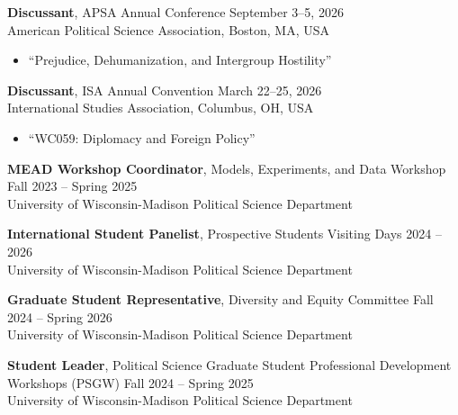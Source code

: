 \documentclass[11pt, letterpaper]{article}
\begin{document}
\vspace{-1mm}
\textbf{Discussant}, APSA Annual Conference \hfill September 3--5, 2026\\
American Political Science Association, Boston, MA, USA
\begin{itemize}
\vspace{-2mm}
    \item ``Prejudice, Dehumanization, and Intergroup Hostility''
\end{itemize}

\vspace{-2mm}
\textbf{Discussant}, ISA Annual Convention \hfill March 22--25, 2026\\
International Studies Association, Columbus, OH, USA
\begin{itemize}
\vspace{-2mm}
    \item ``WC059: Diplomacy and Foreign Policy''
\end{itemize}

\vspace{-2mm}
\textbf{MEAD Workshop Coordinator}, Models, Experiments, and Data Workshop \hfill Fall 2023 -- Spring 2025\\
University of Wisconsin-Madison Political Science Department


\vspace{2mm}
\textbf{International Student Panelist}, Prospective Students Visiting Days \hfill 2024 -- 2026\\
University of Wisconsin-Madison Political Science Department

\vspace{2mm}
\textbf{Graduate Student Representative}, Diversity and Equity Committee \hfill Fall 2024 -- Spring 2026\\
University of Wisconsin-Madison Political Science Department

\vspace{1mm}
\textbf{Student Leader}, Political Science Graduate Student Professional Development Workshops (PSGW) \hfill Fall 2024 -- Spring 2025\\
University of Wisconsin-Madison Political Science Department
\end{document}
